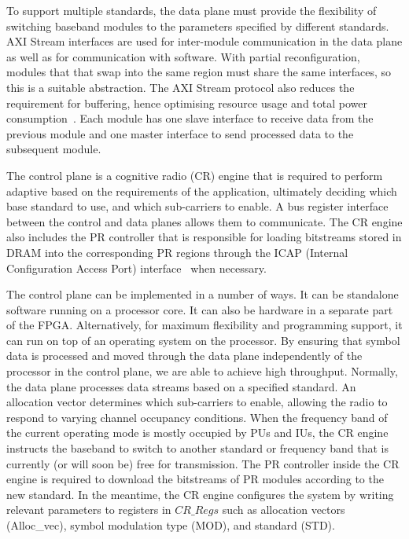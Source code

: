 To support multiple standards, the data plane must provide the flexibility of switching baseband modules to the parameters specified by different standards.
AXI Stream interfaces are used for inter-module communication in the data plane as well as for communication with software.
With partial reconfiguration, modules that that swap into the same region must share the same interfaces, so this is a suitable abstraction.
The AXI Stream protocol also reduces the requirement for buffering, hence optimising resource usage and total power consumption~\cite{Liu2009}.
Each module has one slave interface to receive data from the previous module and one master interface to send processed data to the subsequent module.

The control plane is a cognitive radio (CR) engine that is required to perform adaptive based on the requirements of the application, ultimately deciding which base standard to use, and which sub-carriers to enable.
A bus register interface between the control and data planes allows them to communicate.
The CR engine also includes the PR controller that is responsible for loading bitstreams stored in DRAM into the corresponding PR regions through the ICAP (Internal Configuration Access Port) interface~\cite{Vipin2012} when necessary.

The control plane can be implemented in a number of ways.
It can be standalone software running on a processor core. It can also be hardware in a separate part of the FPGA.
Alternatively, for maximum flexibility and programming support, it can run on top of an operating system on the processor.
By ensuring that symbol data is processed and moved through the data plane independently of the processor in the control plane, we are able to achieve high throughput.
Normally, the data plane processes data streams based on a specified standard.
An allocation vector determines which sub-carriers to enable, allowing the radio to respond to varying channel occupancy conditions.
When the frequency band of the current operating mode is mostly occupied by PUs and IUs, the CR engine instructs the baseband to switch to another standard or frequency band that is currently (or will soon be) free for transmission.
The PR controller inside the CR engine is required to download the bitstreams of PR modules according to the new standard.
In the meantime, the CR engine configures the system by writing relevant parameters to registers in $CR\_Regs$ such as allocation vectors (Alloc\_vec), symbol modulation type (MOD), and standard (STD).

